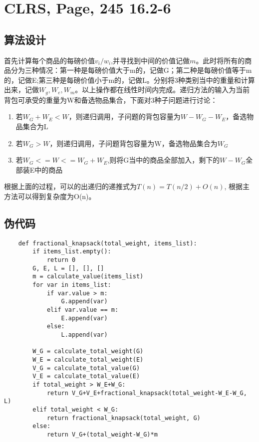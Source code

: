 \documentclass[UTF8]{ctexart}
\begin{document}

\section{CLRS, Page, 245 16.2-6}

\subsection{算法设计}
首先计算每个商品的每磅价值$v_i / w_i$,并寻找到中间的价值记做$m$。此时将所有的商品分为三种情况：第一种是每磅价值大于m的，记做G；第二种是每磅价值等于m的，记做E;第三种是每磅价值小于m的，记做L。分别将3种类别当中的重量和计算出来，记做$W_g, W_e, W_m$。以上操作都在线性时间内完成。递归方法的输入为当前背包可承受的重量为W和备选物品集合，下面对3种子问题进行讨论：
\begin{enumerate}[1.]

    \item 若$W_G + W_E < W$，则递归调用，子问题的背包容量为$W-W_G-W_E$，备选物品集合为L
    \item 若$W_G > W$，则递归调用，子问题背包容量为W，备选物品集合为$W_G$
    \item 若$W_G <= W <= W_G + W_E$,则将G当中的商品全部加入，剩下的$W-W_G$全部装E中的商品

\end{enumerate}

根据上面的过程，可以的出递归的递推式为$T(n) = T(n/2) + O(n)$, 根据主方法可以得到复杂度为O(n)。

\subsection{伪代码}

\begin{lstlisting}
    def fractional_knapsack(total_weight, items_list):
        if items_list.empty():
            return 0
        G, E, L = [], [], []
        m = calculate_value(items_list)
        for var in items_list:
            if var.value > m:
                G.append(var)
            elif var.value == m:
                E.append(var)
            else:
                L.append(var)

        W_G = calculate_total_weight(G)
        W_E = calculate_total_weight(E)
        V_G = calculate_total_value(G)
        V_E = calculate_total_value(E)
        if total_weight > W_E+W_G:
            return V_G+V_E+fractional_knapsack(total_weight-W_E-W_G, L)
        elif total_weight < W_G:
            return fractional_knapsack(total_weight, G)
        else:
            return V_G+(total_weight-W_G)*m
 \end{lstlisting}
  
\end{document}
